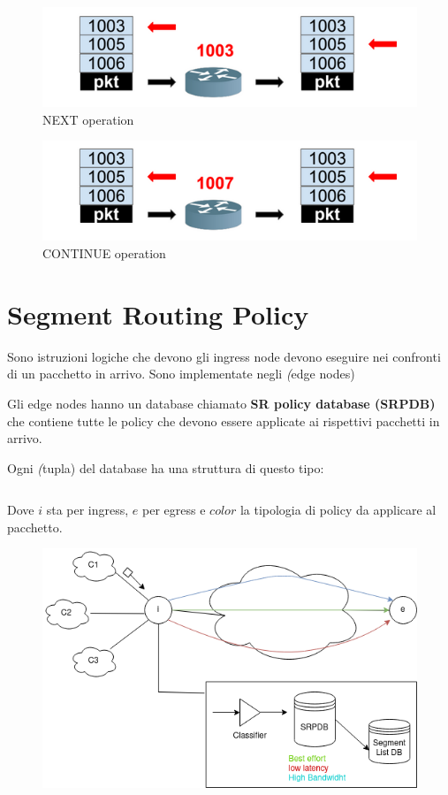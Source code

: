 \documentclass[12pt]{article}
\begin{document}
\begin{figure}[h]
    \includegraphics*[scale = 0.3]{F6.png}
    \centering
    \caption{NEXT operation}
\end{figure}

\begin{figure}[h]
    \includegraphics*[scale = 0.3]{F7.png}
    \centering
    \caption{CONTINUE operation}
\end{figure}


\section{Segment Routing Policy}

Sono istruzioni logiche che devono gli ingress node devono eseguire nei confronti di un pacchetto in arrivo. Sono implementate
negli \textit(edge nodes)

Gli edge nodes hanno un database chiamato \textbf{SR policy database (SRPDB)} che contiene tutte le policy che devono essere applicate
ai rispettivi pacchetti in arrivo. 

Ogni \textit(tupla) del database ha una struttura di questo tipo: 

\[<i,e,color>\]

Dove \(i\) sta per ingress, \(e\) per egress e \(color\) la tipologia di policy da applicare al pacchetto.  

\begin{figure}[h]
    \includegraphics*[scale = 0.5]{F8.png}
    \centering
\end{figure}
\end{document}
